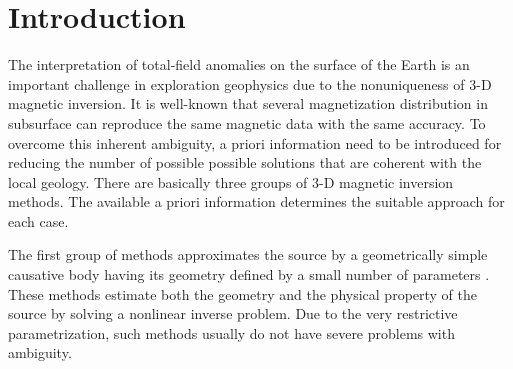\section{Introduction}

The interpretation of total-field anomalies on the surface of the Earth is an 
important challenge in exploration geophysics due to the nonuniqueness of 3-D magnetic 
inversion. It is well-known that several magnetization distribution in subsurface 
can reproduce the same magnetic data with the same accuracy. 
To overcome this inherent ambiguity, a priori information need to be introduced 
for reducing the number of possible possible solutions that are coherent with the local geology.
There are basically three groups of 3-D magnetic inversion methods. The available 
a priori information determines the suitable approach for each case.

The first group of methods approximates the source by a geometrically 
simple causative body having its geometry defined by a small number of parameters 
\cite[e.g., ][]{ballantyne-1980,bhattacharyya-1980,silva-1983}. These methods 
estimate both the geometry and the physical property of the source by solving 
a nonlinear inverse problem. Due to the very restrictive parametrization, 
such methods usually do not have severe problems with ambiguity.

